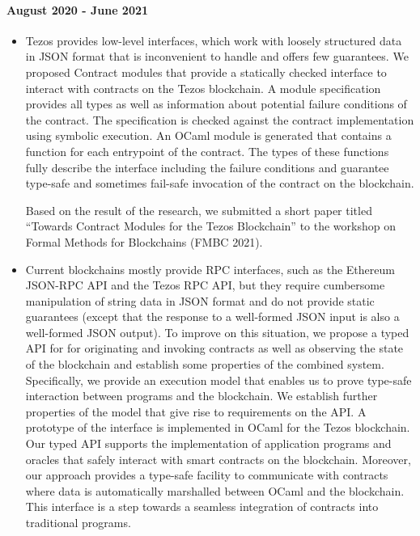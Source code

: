 \documentclass[a4paper,11pt]{article}
\begin{document}
\paragraph{August 2020  - June 2021}
\begin{itemize} 
\item Tezos provides low-level interfaces, which work with loosely structured data in JSON format that is inconvenient to handle and offers few guarantees. We proposed Contract modules that provide a statically checked interface to interact with contracts on the Tezos blockchain. A module specification provides all types as well as information about potential failure conditions of the contract. The specification is checked against the contract implementation using symbolic execution. An OCaml module is generated that contains a function for each entrypoint of the contract. The types of these functions fully describe the interface including the failure conditions and guarantee type-safe and sometimes fail-safe invocation of the contract on the blockchain.

Based on the result of the research, we submitted a short paper titled ``Towards Contract Modules for the Tezos Blockchain''  to the workshop on Formal Methods for Blockchains (FMBC 2021). 

\item Current blockchains mostly provide RPC interfaces, such as the Ethereum JSON-RPC API and the Tezos RPC API, but they require cumbersome manipulation of string data in JSON format and do not provide static
guarantees (except that the response to a well-formed JSON input is also a well-formed JSON output). To improve on this situation, we propose a typed API for for originating and invoking contracts as well as observing the state of the blockchain and establish some properties of the combined system. Specifically, we provide an execution model that enables us to prove type-safe interaction between programs and the blockchain. We establish further properties of the model that give rise to requirements on the API. A prototype of the interface is implemented in OCaml for the Tezos blockchain.  Our typed API supports the
implementation of application programs and oracles that safely interact with
smart contracts on the blockchain. Moreover, our approach provides a type-safe
facility to communicate with contracts where data is automatically marshalled
between OCaml and the blockchain. This interface is a step towards a seamless integration of contracts into traditional programs.


\end{itemize}
\end{document}
